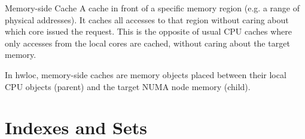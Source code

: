 \begin{DoxyDescription}
\item[Memory-\/side Cache ]A cache in front of a specific memory region (e.\+g. a range of physical addresses). It caches all accesses to that region without caring about which core issued the request. This is the opposite of usual C\+PU caches where only accesses from the local cores are cached, without caring about the target memory.

In hwloc, memory-\/side caches are memory objects placed between their local C\+PU objects (parent) and the target N\+U\+MA node memory (child).  
\end{DoxyDescription}

 \hypertarget{a00380_termsanddefs_indexes}{}\section{Indexes and Sets}\label{a00380_termsanddefs_indexes}

